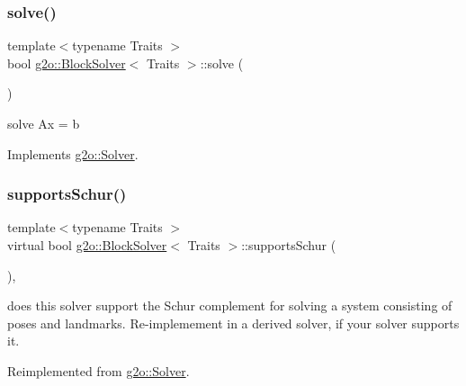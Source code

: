 \mbox{\label{classg2o_1_1_block_solver_a589a75a131cce100c1945ad2786214d7}} 
\subsubsection{\texorpdfstring{solve()}{solve()}}
{\footnotesize\ttfamily template$<$typename Traits $>$ \\
bool \mbox{\hyperlink{classg2o_1_1_block_solver}{g2o\+::\+Block\+Solver}}$<$ Traits $>$\+::solve (\begin{DoxyParamCaption}{ }\end{DoxyParamCaption})\hspace{0.3cm}{\ttfamily [virtual]}}

solve Ax = b 

Implements \mbox{\hyperlink{classg2o_1_1_solver_a9c359a886db57f2f81e54a2113f3bd38}{g2o\+::\+Solver}}.

\mbox{\label{classg2o_1_1_block_solver_a68dc822ce48e80ceacce69c7bd029674}} 
\subsubsection{\texorpdfstring{supports\+Schur()}{supportsSchur()}}
{\footnotesize\ttfamily template$<$typename Traits $>$ \\
virtual bool \mbox{\hyperlink{classg2o_1_1_block_solver}{g2o\+::\+Block\+Solver}}$<$ Traits $>$\+::supports\+Schur (\begin{DoxyParamCaption}{ }\end{DoxyParamCaption})\hspace{0.3cm}{\ttfamily [inline]}, {\ttfamily [virtual]}}

does this solver support the Schur complement for solving a system consisting of poses and landmarks. Re-\/implemement in a derived solver, if your solver supports it. 

Reimplemented from \mbox{\hyperlink{classg2o_1_1_solver_a36c68f7bc0b8864ee7722bc3c06de554}{g2o\+::\+Solver}}.

\mbox{\label{classg2o_1_1_block_solver_a662473598270cdf89075607f87440759}} 
